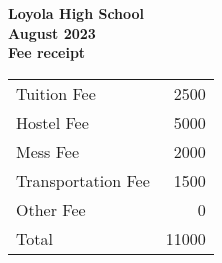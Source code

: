 \documentclass{article}
\begin{document}
    \begin{center}
        \textbf{Loyola High School} \\
        \textbf{August 2023}\\
        \textbf{Fee receipt} \\ 
        \hfill\break
        \begin{tabular}{|l | r|}
            \hline 
            Tuition Fee & 2500 \\
            Hostel Fee & 5000 \\
            Mess Fee & 2000 \\
            Transportation Fee & 1500 \\
            Other Fee & 0 \\
            \hline
            Total & 11000 \\
            \hline
        \end{tabular}
    \end{center}
\end{document}
